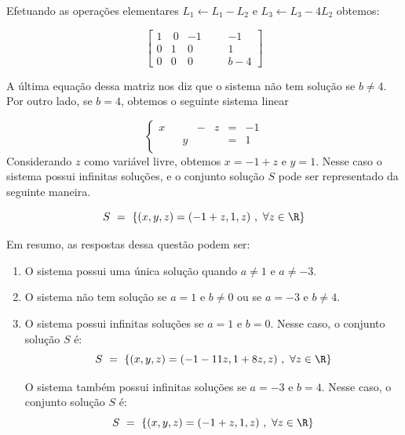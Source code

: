 \begin{solution}
Efetuando as operações elementares $L_1 \leftarrow L_1 - L_2$  e   $L_3 \leftarrow L_3 - 4L_2$ obtemos:

$$ \left[\begin{array}{rrrr|rc}
  1 & \ 0 &   -1 & & &  -1    \\
  0 &   1 &    0 & & &   1    \\ 
  0 &   0 &    0 & & &   b-4  \end{array}\right] $$

A última equação dessa matriz nos diz que o sistema não tem solução se $b \neq 4$.
Por outro lado, se $b=4$, obtemos o seguinte sistema linear

$$\left\{\begin{array}{rrrrrrr}
 x &   &    & - &   z & = & -1 \\
   &   &  y &   &     & = &  1 \\  \end{array} \right.$$\noindent 
Considerando $z$ como variável livre, obtemos $x=-1+z$ e $y=1$. Nesse caso o sistema possui infinitas soluções, e o conjunto solução $S$ pode ser representado da seguinte maneira.

$$S\ =\ \left\{ (x,y,z) = (-1+z, 1 , z)\ ,\ \forall z \in \R \right\} $$

\bigskip
Em resumo, as respostas dessa questão podem ser:

\bigskip
\begin{enumerate}
\item[(a)] O sistema possui uma única solução quando $a \neq 1$ e $a \neq -3$.
\item[(b)] O sistema não tem solução se $a=1$ e $b \neq 0$ ou se $a=-3$ e $b\neq 4$.
\item[(c)] O sistema possui infinitas soluções se $a=1$ e $b=0$. Nesse caso, o conjunto solução $S$ é:
$$S\ =\ \left\{ (x,y,z) = (-1-11z, 1+8z , z)\ ,\ \forall z \in \R \right\} $$

O sistema também possui infinitas soluções se $a=-3$ e $b=4$.  Nesse caso, o conjunto solução $S$ é:
$$S\ =\ \left\{ (x,y,z) = (-1+z, 1 , z)\ ,\ \forall z \in \R \right\} $$
\end{enumerate}
\end{solution}

